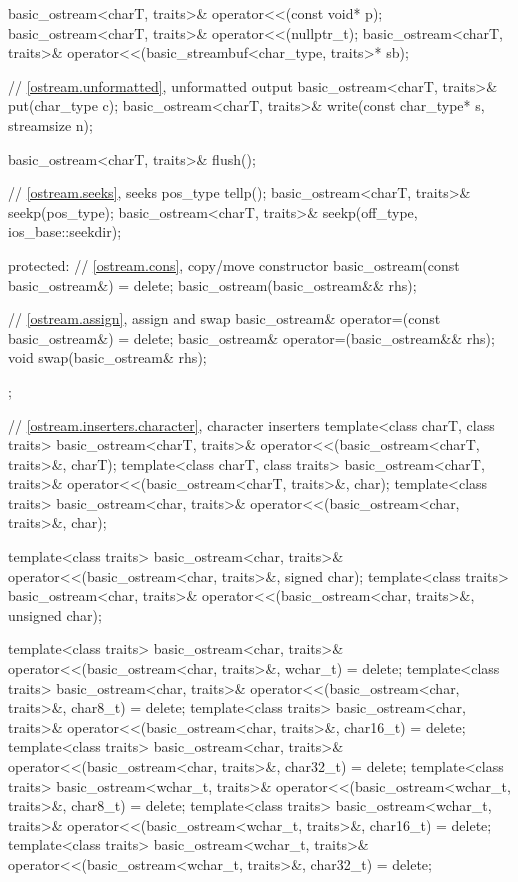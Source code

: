 \begin{codeblock}
{{    basic_ostream<charT, traits>& operator<<(const void* p);
    basic_ostream<charT, traits>& operator<<(nullptr_t);
    basic_ostream<charT, traits>& operator<<(basic_streambuf<char_type, traits>* sb);

    // \ref{ostream.unformatted}, unformatted output
    basic_ostream<charT, traits>& put(char_type c);
    basic_ostream<charT, traits>& write(const char_type* s, streamsize n);

    basic_ostream<charT, traits>& flush();

    // \ref{ostream.seeks}, seeks
    pos_type tellp();
    basic_ostream<charT, traits>& seekp(pos_type);
    basic_ostream<charT, traits>& seekp(off_type, ios_base::seekdir);

  protected:
    // \ref{ostream.cons}, copy/move constructor
    basic_ostream(const basic_ostream&) = delete;
    basic_ostream(basic_ostream&& rhs);

    // \ref{ostream.assign}, assign and swap
    basic_ostream& operator=(const basic_ostream&) = delete;
    basic_ostream& operator=(basic_ostream&& rhs);
    void swap(basic_ostream& rhs);
  };

  // \ref{ostream.inserters.character}, character inserters
  template<class charT, class traits>
    basic_ostream<charT, traits>& operator<<(basic_ostream<charT, traits>&, charT);
  template<class charT, class traits>
    basic_ostream<charT, traits>& operator<<(basic_ostream<charT, traits>&, char);
  template<class traits>
    basic_ostream<char, traits>& operator<<(basic_ostream<char, traits>&, char);

  template<class traits>
    basic_ostream<char, traits>& operator<<(basic_ostream<char, traits>&, signed char);
  template<class traits>
    basic_ostream<char, traits>& operator<<(basic_ostream<char, traits>&, unsigned char);

  template<class traits>
    basic_ostream<char, traits>& operator<<(basic_ostream<char, traits>&, wchar_t) = delete;
  template<class traits>
    basic_ostream<char, traits>& operator<<(basic_ostream<char, traits>&, char8_t) = delete;
  template<class traits>
    basic_ostream<char, traits>& operator<<(basic_ostream<char, traits>&, char16_t) = delete;
  template<class traits>
    basic_ostream<char, traits>& operator<<(basic_ostream<char, traits>&, char32_t) = delete;
  template<class traits>
    basic_ostream<wchar_t, traits>&
      operator<<(basic_ostream<wchar_t, traits>&, char8_t) = delete;
  template<class traits>
    basic_ostream<wchar_t, traits>&
      operator<<(basic_ostream<wchar_t, traits>&, char16_t) = delete;
  template<class traits>
    basic_ostream<wchar_t, traits>&
      operator<<(basic_ostream<wchar_t, traits>&, char32_t) = delete;

}
\end{codeblock}
